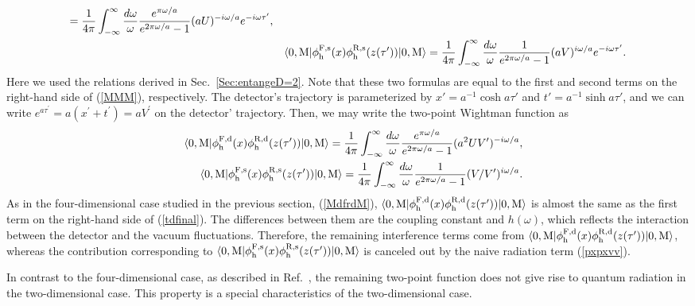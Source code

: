 \documentclass[aps,prd,preprintnumbers,nofootinbib,showpacs,11pt]{revtex4}%
\begin{document}
\begin{widetext}
\begin{eqnarray}
=
{1\over 4\pi}\int_{-\infty}^\infty {d\omega\over \omega}
{e^{\pi\omega/a}\over e^{2\pi\omega/a}-1}
(aU)^{-{{i \omega}/ a}}e^{-i\omega\tau'},
\\
&&\langle 0,{\rm M}| \phi_{\rm h}^{\rm F,s}(x) \phi_{\rm h}^{\rm R,s}(z(\tau'))|0, {\rm M}\rangle
=
{1\over 4\pi}\int_{-\infty}^\infty {d\omega\over \omega}
{1\over e^{2\pi\omega/a} -1}
(aV)^{{i \omega}/ a}
e^{-i\omega\tau'}.
\end{eqnarray}
Here we used the relations derived in Sec.~\ref{Sec:entangeD=2}. 
Note that these two formulas are equal to the first 
and second terms on the right-hand side of (\ref{MMM}), respectively. 
The detector's trajectory is parameterized by 
$x'={a}^{-1}\cosh a\tau'$ and $t'={a}^{-1}\sinh a\tau'$, 
and we can write $e^{a\tau^{\prime}}=a(x^{\prime}+t^{\prime})=aV^{\prime}$
on the detector' trajectory. 
Then, we may write the two-point Wightman function as 
\begin{eqnarray}
&&\langle 0,{\rm M}| \phi_{\rm h}^{\rm F,d}(x) \phi_{\rm h}^{\rm R,d}(z(\tau'))|0, {\rm M}\rangle
=
{1\over 4\pi}\int_{-\infty}^\infty {d\omega\over \omega}
{e^{\pi\omega/a}\over e^{2\pi\omega/a}-1}
(a^2 UV^{\prime} )^{-i\omega/ a},
\label{MdfrdM}
\\
&&\langle 0,{\rm M}| \phi_{\rm h}^{\rm F,s}(x) \phi_{\rm h}^{\rm R,s}(z(\tau'))|0, {\rm M}\rangle
=
{1\over 4\pi}\int_{-\infty}^\infty {d\omega\over \omega}
{1\over e^{2\pi\omega/a} -1}
(V /V^{\prime})^{i\omega / a}.
\label{MsfsdM}
\end{eqnarray}
As in the four-dimensional case studied in the previous section, (\ref{MdfrdM}), 
$\langle 0,{\rm M}| \phi_{\rm h}^{\rm F,d}(x) \phi_{\rm h}^{\rm R,d}(z(\tau'))|0, {\rm M}\rangle$
is almost the same as the first term on the right-hand side of (\ref{tdfinal}). 
The differences between them are the coupling constant and $h(\omega)$, which reflects the
interaction between the detector and the vacuum fluctuations. 
Therefore, the remaining interference terms come from 
$\langle 0,{\rm M}| \phi_{\rm h}^{\rm F,d}(x) \phi_{\rm h}^{\rm R,d}(z(\tau'))|0, {\rm M}\rangle$, 
whereas the contribution corresponding to 
$\langle 0,{\rm M}| \phi_{\rm h}^{\rm F,s}(x) \phi_{\rm h}^{\rm R,s}(z(\tau'))|0, {\rm M}\rangle$ 
is canceled out by the naive radiation term (\ref{pxpxvv}). 

In contrast to the four-dimensional case, as described in Ref.~\cite{HuRaval}, 
the remaining two-point function does not give rise to quantum radiation in 
the two-dimensional case. 
This property is a special characteristics of the two-dimensional case. 


\end{widetext}
\end{document}
